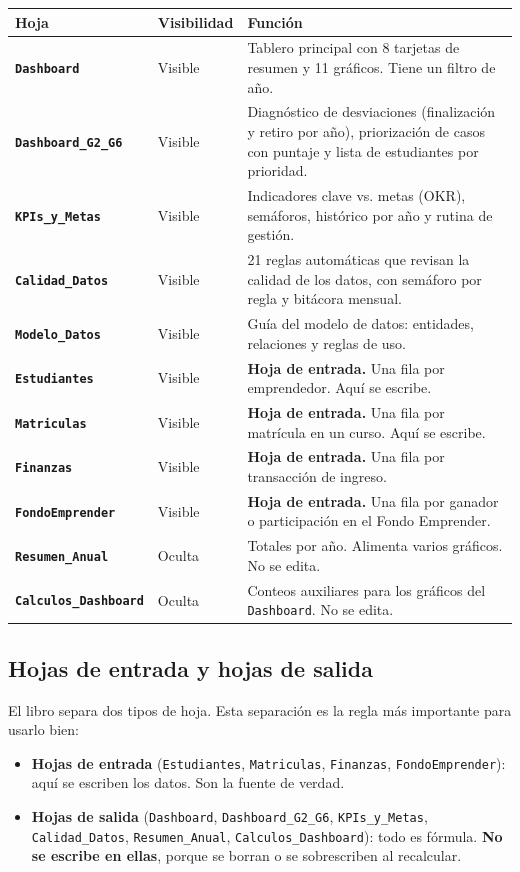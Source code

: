 \documentclass[11pt,a4paper]{article}
\begin{document}
\begin{longtable}{@{}>{\bfseries}p{3.4cm}p{2.0cm}p{9.4cm}@{}}
\toprule
Hoja & Visibilidad & Función\\
\midrule
\endhead
\texttt{Dashboard} & Visible & Tablero principal con 8 tarjetas de resumen y 11 gráficos. Tiene un filtro de año.\\
\texttt{Dashboard\_G2\_G6} & Visible & Diagnóstico de desviaciones (finalización y retiro por año), priorización de casos con puntaje y lista de estudiantes por prioridad.\\
\texttt{KPIs\_y\_Metas} & Visible & Indicadores clave vs. metas (OKR), semáforos, histórico por año y rutina de gestión.\\
\texttt{Calidad\_Datos} & Visible & 21 reglas automáticas que revisan la calidad de los datos, con semáforo por regla y bitácora mensual.\\
\texttt{Modelo\_Datos} & Visible & Guía del modelo de datos: entidades, relaciones y reglas de uso.\\
\texttt{Estudiantes} & Visible & \textbf{Hoja de entrada.} Una fila por emprendedor. Aquí se escribe.\\
\texttt{Matriculas} & Visible & \textbf{Hoja de entrada.} Una fila por matrícula en un curso. Aquí se escribe.\\
\texttt{Finanzas} & Visible & \textbf{Hoja de entrada.} Una fila por transacción de ingreso.\\
\texttt{FondoEmprender} & Visible & \textbf{Hoja de entrada.} Una fila por ganador o participación en el Fondo Emprender.\\
\texttt{Resumen\_Anual} & Oculta & Totales por año. Alimenta varios gráficos. No se edita.\\
\texttt{Calculos\_Dashboard} & Oculta & Conteos auxiliares para los gráficos del \texttt{Dashboard}. No se edita.\\
\bottomrule
\end{longtable}

\subsection{Hojas de entrada y hojas de salida}

El libro separa dos tipos de hoja. Esta separación es la regla más importante para usarlo bien:

\begin{itemize}[leftmargin=1.4em]
  \item \textbf{Hojas de entrada} (\texttt{Estudiantes}, \texttt{Matriculas}, \texttt{Finanzas}, \texttt{FondoEmprender}): aquí se escriben los datos. Son la fuente de verdad.
  \item \textbf{Hojas de salida} (\texttt{Dashboard}, \texttt{Dashboard\_G2\_G6}, \texttt{KPIs\_y\_Metas}, \texttt{Calidad\_Datos}, \texttt{Resumen\_Anual}, \texttt{Calculos\_Dashboard}): todo es fórmula. \textbf{No se escribe en ellas}, porque se borran o se sobrescriben al recalcular.
\end{itemize}
\end{document}
